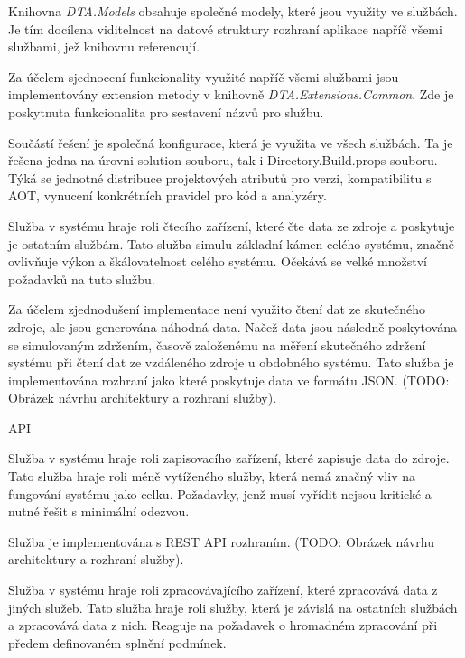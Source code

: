 
Knihovna \emph{DTA.Models} obsahuje společné modely, které jsou využity ve službách. Je tím docílena viditelnost na datové struktury rozhraní aplikace napříč všemi službami, jež knihovnu referencují.


Za účelem sjednocení funkcionality využité napříč všemi službami jsou implementovány extension metody v knihovně \emph{DTA.Extensions.Common}. Zde je poskytnuta funkcionalita pro sestavení názvů pro službu.


Součástí řešení je společná konfigurace, která je využita ve všech službách. Ta je řešena jedna na úrovni solution souboru, tak i Directory.Build.props souboru. Týká se jednotné distribuce projektových atributů pro verzi, kompatibilitu s AOT, vynucení konkrétních pravidel pro kód a analyzéry.


Služba v systému hraje roli čtecího zařízení, které čte data ze zdroje a poskytuje je ostatním službám. Tato služba simulu základní kámen celého systému, značně ovlivňuje výkon a škálovatelnost celého systému. Očekává se velké množství požadavků na tuto službu.

Za účelem zjednodušení implementace není využito čtení dat ze skutečného zdroje, ale jsou generována náhodná data. Načež data jsou následně poskytována se simulovaným zdržením, časově založenému na měření skutečného zdržení systému při čtení dat ze vzdáleného zdroje u obdobného systému. Tato služba je implementována rozhraní jako  které poskytuje data ve formátu JSON. (TODO: Obrázek návrhu architektury a rozhraní služby).

API


Služba v systému hraje roli zapisovacího zařízení, které zapisuje data do zdroje. Tato služba hraje roli méně vytíženého služby, která nemá značný vliv na fungování systému jako celku. Požadavky, jenž musí vyřídit nejsou kritické a nutné řešit s minimální odezvou.

Služba je implementována s REST API rozhraním. (TODO: Obrázek návrhu architektury a rozhraní služby).


Služba v systému hraje roli zpracovávajícího zařízení, které zpracovává data z jiných služeb. Tato služba hraje roli služby, která je závislá na ostatních službách a zpracovává data z nich. Reaguje na požadavek o hromadném zpracování při předem definovaném splnění podmínek.

